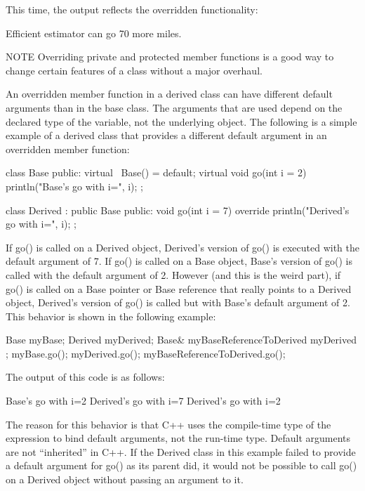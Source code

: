 This time, the output reflects the overridden functionality:

\begin{shell}
Efficient estimator can go 70 more miles.
\end{shell}

\begin{myNotic}{NOTE}
Overriding private and protected member functions is a good way to change certain features of a class without a major overhaul.
\end{myNotic}



An overridden member function in a derived class can have different default arguments than in the base class. The arguments that are used depend on the declared type of the variable, not the underlying object. The following is a simple example of a derived class that provides a different default argument in an overridden member function:

\begin{cpp}
class Base
{
    public:
        virtual ~Base() = default;
        virtual void go(int i = 2) { println("Base's go with i={}", i); }
};

class Derived : public Base
{
    public:
        void go(int i = 7) override { println("Derived's go with i={}", i); }
};
\end{cpp}

If go() is called on a Derived object, Derived’s version of go() is executed with the default argument of 7. If go() is called on a Base object, Base’s version of go() is called with the default argument of 2. However (and this is the weird part), if go() is called on a Base pointer or Base reference that really points to a Derived object, Derived’s version of go() is called but with Base’s default argument of 2. This behavior is shown in the following example:

\begin{cpp}
Base myBase;
Derived myDerived;
Base& myBaseReferenceToDerived { myDerived };
myBase.go();
myDerived.go();
myBaseReferenceToDerived.go();
\end{cpp}

The output of this code is as follows:

\begin{shell}
Base's go with i=2
Derived's go with i=7
Derived's go with i=2
\end{shell}

The reason for this behavior is that C++ uses the compile-time type of the expression to bind default arguments, not the run-time type. Default arguments are not “inherited” in C++. If the Derived class in this example failed to provide a default argument for go() as its parent did, it would not be possible to call go() on a Derived object without passing an argument to it.

